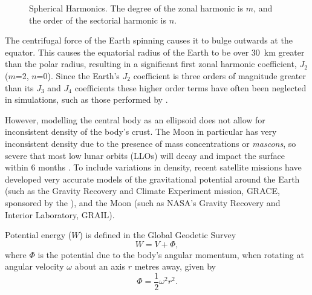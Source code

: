 \begin{figure}
\centering
\def\svgwidth{0.6\textwidth}

\caption{Spherical Harmonics. The degree of the zonal harmonic is $m$, and the order of the sectorial harmonic is $n$. %
} \label{fig:Spherical-Harmonics}
\end{figure}

The centrifugal force of the Earth spinning causes it to bulge outwards at the equator. This causes the equatorial radius of the Earth to be over 30~km greater than the polar radius, resulting in a significant first zonal harmonic coefficient, $J_{2}$ ($m$=2, $n$=0). Since the Earth's $J_{2}$ coefficient is three orders of magnitude greater than its $J_{3}$ and $J_{4}$ coefficients these higher order terms have often been neglected in simulations, such as those performed by \textcite{Yang2007}.

However, modelling the central body as an ellipsoid does not allow for inconsistent density of the body's crust. The Moon in particular has very inconsistent density due to the presence of mass concentrations or \emph{mascons}, so severe that most low lunar orbits (LLOs) will decay and impact the surface within 6 months \parencite{Zeile2010}. To include variations in density, recent satellite missions have developed very accurate models of the gravitational potential around the Earth (such as the Gravity Recovery and Climate Experiment mission, GRACE, sponsored by the \cite{EIGEN-5C}), and the Moon (such as NASA's Gravity Recovery and Interior Laboratory, GRAIL).

Potential energy ($W$) is defined in the Global Geodetic Survey \parencite{WGS84}
\begin{equation}\label{eq:Total-Grav-Potential}
W=V+\Phi,
\end{equation}
where $\Phi$ is the potential due to the body's angular momentum, when rotating at angular velocity $\omega$ about an axis $r$ metres away, given by
\begin{equation}\label{eq:Angular-Momentum}
\Phi=\frac{1}{2}\omega^{2}r^{2}.
\end{equation}

